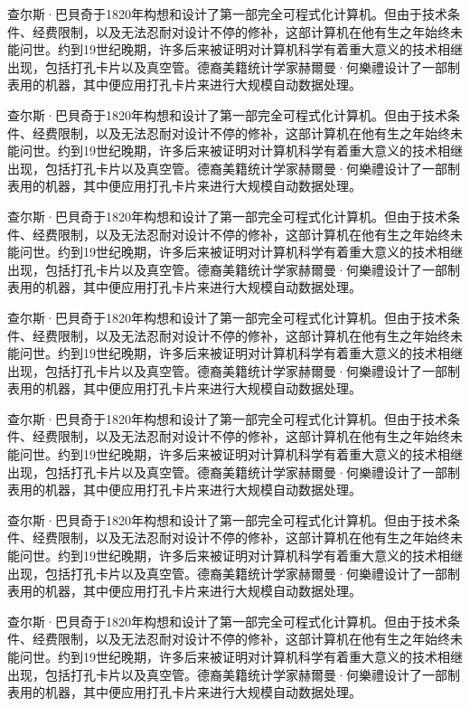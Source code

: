 \documentclass[oneside,a4paper,12pt,AutoFakeBold]{book}%
\begin{document}
查尔斯·巴貝奇于1820年构想和设计了第一部完全可程式化计算机。但由于技术条件、经费限制，以及无法忍耐对设计不停的修补，这部计算机在他有生之年始终未能问世。约到19世纪晚期，许多后来被证明对计算机科学有着重大意义的技术相继出现，包括打孔卡片以及真空管。德裔美籍统计学家赫爾曼·何樂禮设计了一部制表用的机器，其中便应用打孔卡片来进行大规模自动数据处理。

查尔斯·巴貝奇于1820年构想和设计了第一部完全可程式化计算机。但由于技术条件、经费限制，以及无法忍耐对设计不停的修补，这部计算机在他有生之年始终未能问世。约到19世纪晚期，许多后来被证明对计算机科学有着重大意义的技术相继出现，包括打孔卡片以及真空管。德裔美籍统计学家赫爾曼·何樂禮设计了一部制表用的机器，其中便应用打孔卡片来进行大规模自动数据处理。

查尔斯·巴貝奇于1820年构想和设计了第一部完全可程式化计算机。但由于技术条件、经费限制，以及无法忍耐对设计不停的修补，这部计算机在他有生之年始终未能问世。约到19世纪晚期，许多后来被证明对计算机科学有着重大意义的技术相继出现，包括打孔卡片以及真空管。德裔美籍统计学家赫爾曼·何樂禮设计了一部制表用的机器，其中便应用打孔卡片来进行大规模自动数据处理。

查尔斯·巴貝奇于1820年构想和设计了第一部完全可程式化计算机。但由于技术条件、经费限制，以及无法忍耐对设计不停的修补，这部计算机在他有生之年始终未能问世。约到19世纪晚期，许多后来被证明对计算机科学有着重大意义的技术相继出现，包括打孔卡片以及真空管。德裔美籍统计学家赫爾曼·何樂禮设计了一部制表用的机器，其中便应用打孔卡片来进行大规模自动数据处理。

查尔斯·巴貝奇于1820年构想和设计了第一部完全可程式化计算机。但由于技术条件、经费限制，以及无法忍耐对设计不停的修补，这部计算机在他有生之年始终未能问世。约到19世纪晚期，许多后来被证明对计算机科学有着重大意义的技术相继出现，包括打孔卡片以及真空管。德裔美籍统计学家赫爾曼·何樂禮设计了一部制表用的机器，其中便应用打孔卡片来进行大规模自动数据处理。

查尔斯·巴貝奇于1820年构想和设计了第一部完全可程式化计算机。但由于技术条件、经费限制，以及无法忍耐对设计不停的修补，这部计算机在他有生之年始终未能问世。约到19世纪晚期，许多后来被证明对计算机科学有着重大意义的技术相继出现，包括打孔卡片以及真空管。德裔美籍统计学家赫爾曼·何樂禮设计了一部制表用的机器，其中便应用打孔卡片来进行大规模自动数据处理。

查尔斯·巴貝奇于1820年构想和设计了第一部完全可程式化计算机。但由于技术条件、经费限制，以及无法忍耐对设计不停的修补，这部计算机在他有生之年始终未能问世。约到19世纪晚期，许多后来被证明对计算机科学有着重大意义的技术相继出现，包括打孔卡片以及真空管。德裔美籍统计学家赫爾曼·何樂禮设计了一部制表用的机器，其中便应用打孔卡片来进行大规模自动数据处理。
\end{document}
